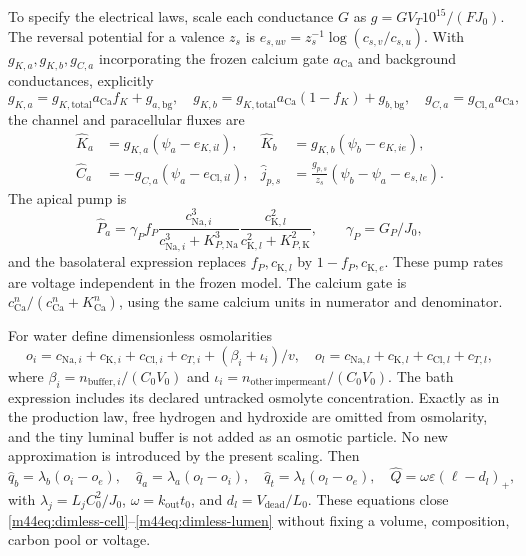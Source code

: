 To specify the electrical laws, scale each conductance $G$ as
$g=GV_T10^{15}/(FJ_0)$.  The reversal potential for a valence $z_s$ is
$e_{s,uv}=z_s^{-1}\log(c_{s,v}/c_{s,u})$.  With
$g_{K,a},g_{K,b},g_{C,a}$ incorporating the frozen calcium gate
$a_{\mathrm{Ca}}$ and background conductances, explicitly
\[
 g_{K,a}=g_{K,\mathrm{total}}a_{\mathrm{Ca}}f_K+g_{a,\mathrm{bg}},\quad
 g_{K,b}=g_{K,\mathrm{total}}a_{\mathrm{Ca}}(1-f_K)+g_{b,\mathrm{bg}},\quad
 g_{C,a}=g_{\mathrm{Cl},a}a_{\mathrm{Ca}},
\]
the channel and paracellular fluxes are
\begin{align*}
 \widehat K_a&=g_{K,a}(\psi_a-e_{K,il}), &
 \widehat K_b&=g_{K,b}(\psi_b-e_{K,ie}),\\
 \widehat C_a&=-g_{C,a}(\psi_a-e_{\mathrm{Cl},il}), &
 \widehat j_{p,s}&=\frac{g_{p,s}}{z_s}
   (\psi_b-\psi_a-e_{s,le}).
\end{align*}
The apical pump is
\[
 \widehat P_a=\gamma_P f_P
 \frac{c_{\mathrm{Na},i}^3}{c_{\mathrm{Na},i}^3+K_{P,\mathrm{Na}}^3}
 \frac{c_{\mathrm K,l}^2}{c_{\mathrm K,l}^2+K_{P,\mathrm K}^2},
 \qquad\gamma_P=G_P/J_0,
\]
and the basolateral expression replaces $f_P,c_{\mathrm K,l}$ by
$1-f_P,c_{\mathrm K,e}$.  These pump rates are voltage independent in the
frozen model.  The calcium gate is $c_{\mathrm{Ca}}^n/(c_{\mathrm{Ca}}^n+K_{\mathrm{Ca}}^n)$,
using the same calcium units in numerator and denominator.

For water define dimensionless osmolarities
\[
 o_i=c_{\mathrm{Na},i}+c_{\mathrm K,i}+c_{\mathrm{Cl},i}+c_{T,i}
       +(\beta_i+\iota_i)/v,\quad
 o_l=c_{\mathrm{Na},l}+c_{\mathrm K,l}+c_{\mathrm{Cl},l}+c_{T,l},
\]
where $\beta_i=n_{\mathrm{buffer},i}/(C_0V_0)$ and
$\iota_i=n_{\mathrm{other\ impermeant}}/(C_0V_0)$.  The bath expression
includes its declared untracked osmolyte concentration.  Exactly as in the
production law, free hydrogen and hydroxide are omitted from osmolarity,
and the tiny luminal buffer is not added as an osmotic particle.  No new
approximation is introduced by the present scaling.  Then
\[
 \widehat q_b=\lambda_b(o_i-o_e),\quad
 \widehat q_a=\lambda_a(o_l-o_i),\quad
 \widehat q_t=\lambda_t(o_l-o_e),\quad
 \widehat Q=\omega\varepsilon(\ell-d_l)_+,
\]
with $\lambda_j=L_jC_0^2/J_0$, $\omega=k_{\mathrm{out}}t_0$,
and $d_l=V_{\mathrm{dead}}/L_0$.  These equations close
\eqref{m44eq:dimless-cell}--\eqref{m44eq:dimless-lumen} without fixing a volume,
composition, carbon pool or voltage.

